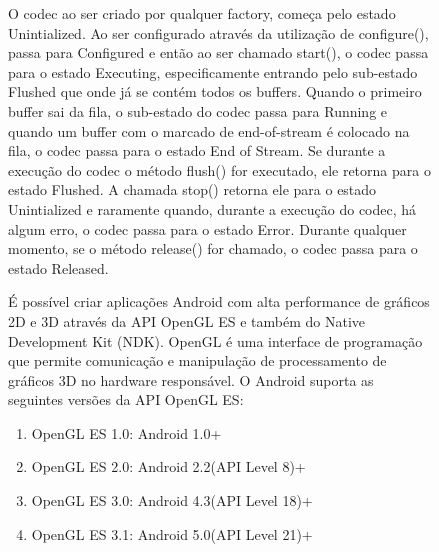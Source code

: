 \documentclass[sigconf]{acmart}
\begin{document}
\begin{figure}[h!]
O codec ao ser criado por qualquer factory, começa pelo estado Unintialized. Ao ser configurado através da utilização de configure(), passa para Configured e então ao ser chamado start(), o codec passa para o estado Executing, especificamente entrando pelo sub-estado Flushed que onde já se contém todos os buffers. Quando o primeiro buffer sai da fila, o sub-estado do codec passa para Running e quando um buffer com o marcado de end-of-stream é colocado na fila, o codec passa para o estado End of Stream. Se durante a execução do codec o método flush() for executado, ele retorna para o estado Flushed. A chamada stop() retorna ele para o estado Unintialized e raramente quando, durante a execução do codec, há algum erro, o codec passa para o estado Error. Durante qualquer momento, se o método release() for chamado, o codec passa para o estado Released.

É possível criar aplicações Android com alta performance de gráficos 2D e 3D através da API OpenGL ES e também do Native Development Kit (NDK). OpenGL é uma interface de programação que permite comunicação e manipulação de processamento de gráficos 3D no hardware responsável. O Android suporta as seguintes versões da API OpenGL ES:
\begin{enumerate}
    \item OpenGL ES 1.0: Android 1.0+
    \item OpenGL ES 2.0: Android 2.2(API Level 8)+
    \item OpenGL ES 3.0: Android 4.3(API Level 18)+
    \item OpenGL ES 3.1: Android 5.0(API Level 21)+
\end{enumerate}


\end{figure}
\end{document}
